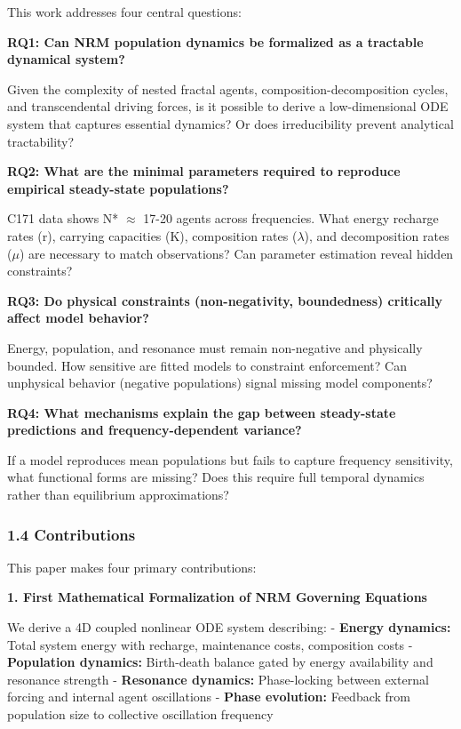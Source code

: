 \documentclass[
]{article}
\begin{document}
This work addresses four central questions:

\textbf{RQ1: Can NRM population dynamics be formalized as a tractable
dynamical system?}

Given the complexity of nested fractal agents, composition-decomposition
cycles, and transcendental driving forces, is it possible to derive a
low-dimensional ODE system that captures essential dynamics? Or does
irreducibility prevent analytical tractability?

\textbf{RQ2: What are the minimal parameters required to reproduce
empirical steady-state populations?}

C171 data shows N* $\approx$ 17-20 agents across frequencies. What energy
recharge rates (r), carrying capacities (K), composition rates ($\lambda$), and
decomposition rates ($\mu$) are necessary to match observations? Can
parameter estimation reveal hidden constraints?

\textbf{RQ3: Do physical constraints (non-negativity, boundedness)
critically affect model behavior?}

Energy, population, and resonance must remain non-negative and
physically bounded. How sensitive are fitted models to constraint
enforcement? Can unphysical behavior (negative populations) signal
missing model components?

\textbf{RQ4: What mechanisms explain the gap between steady-state
predictions and frequency-dependent variance?}

If a model reproduces mean populations but fails to capture frequency
sensitivity, what functional forms are missing? Does this require full
temporal dynamics rather than equilibrium approximations?

\subsubsection{1.4 Contributions}\label{contributions}

This paper makes four primary contributions:

\textbf{1. First Mathematical Formalization of NRM Governing Equations}

We derive a 4D coupled nonlinear ODE system describing: - \textbf{Energy
dynamics:} Total system energy with recharge, maintenance costs,
composition costs - \textbf{Population dynamics:} Birth-death balance
gated by energy availability and resonance strength - \textbf{Resonance
dynamics:} Phase-locking between external forcing and internal agent
oscillations - \textbf{Phase evolution:} Feedback from population size
to collective oscillation frequency
\end{document}
